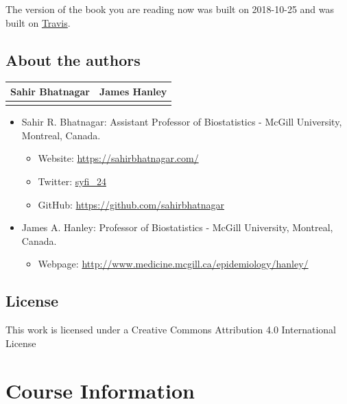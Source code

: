 \documentclass[]{book}
\providecommand{\tightlist}{%
  \setlength{\itemsep}{0pt}\setlength{\parskip}{0pt}}
\providecommand{\tightlist}{%
  \setlength{\itemsep}{0pt}\setlength{\parskip}{0pt}}
\theoremstyle{definition}
\theoremstyle{definition}
\theoremstyle{definition}
\theoremstyle{remark}
\begin{document}
The version of the book you are reading now was built on 2018-10-25 and
was built on
\href{https://travis-ci.org/sahirbhatnagar/MATH697}{Travis}.

\section{About the authors}\label{about-the-authors}

\begin{longtable}[]{@{}cc@{}}
\toprule
Sahir Bhatnagar & James Hanley\tabularnewline
\midrule
\endhead
&\tabularnewline
\bottomrule
\end{longtable}

\begin{itemize}
\tightlist
\item
  Sahir R. Bhatnagar: Assistant Professor of Biostatistics - McGill
  University, Montreal, Canada.

  \begin{itemize}
  \tightlist
  \item
    Website: \url{https://sahirbhatnagar.com/}\\
  \item
    Twitter: \href{https://twitter.com/syfi_24}{syfi\_24}\\
  \item
    GitHub: \url{https://github.com/sahirbhatnagar}\\
  \end{itemize}
\item
  James A. Hanley: Professor of Biostatistics - McGill University,
  Montreal, Canada.

  \begin{itemize}
  \tightlist
  \item
    Webpage: \url{http://www.medicine.mcgill.ca/epidemiology/hanley/}
  \end{itemize}
\end{itemize}

\section{License}\label{license}

This work is licensed under a Creative Commons Attribution 4.0
International License

\chapter{Course Information}\label{course-information}
\end{document}
